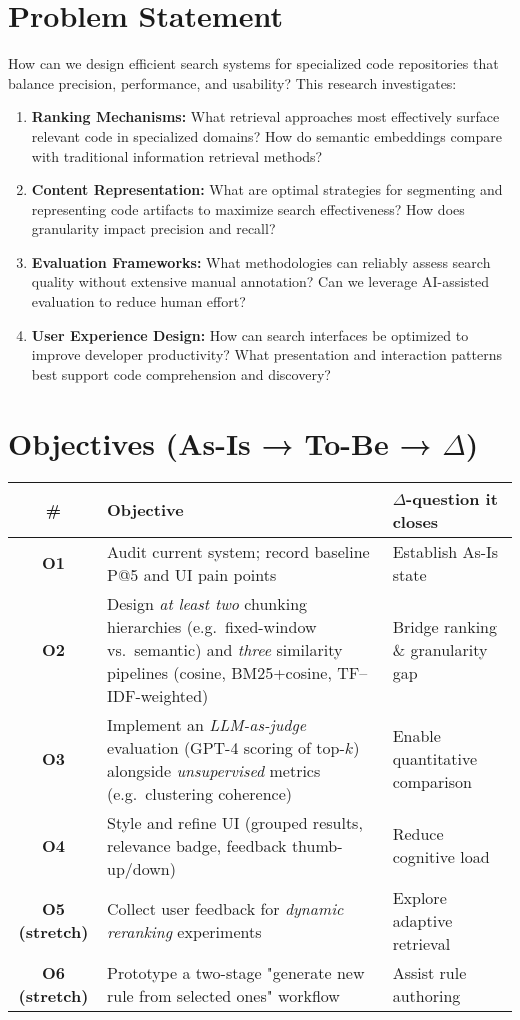 \documentclass[12pt,a4paper]{article}
\begin{document}
\section*{Problem Statement}
How can we design efficient search systems for specialized code repositories that balance precision, performance, and usability? This research investigates:
\begin{enumerate}
  \item \textbf{Ranking Mechanisms:} What retrieval approaches most effectively surface relevant code in specialized domains? How do semantic embeddings compare with traditional information retrieval methods?
  
  \item \textbf{Content Representation:} What are optimal strategies for segmenting and representing code artifacts to maximize search effectiveness? How does granularity impact precision and recall?
  
  \item \textbf{Evaluation Frameworks:} What methodologies can reliably assess search quality without extensive manual annotation? Can we leverage AI-assisted evaluation to reduce human effort?
  
  \item \textbf{User Experience Design:} How can search interfaces be optimized to improve developer productivity? What presentation and interaction patterns best support code comprehension and discovery?
\end{enumerate}

\section*{Objectives (As-Is → To-Be → \(\Delta\))}
\begin{table}[H]
\centering
\begin{tabularx}{\textwidth}{|c|X|X|}
\hline
\textbf{\#} & \textbf{Objective} & \textbf{\(\Delta\)-question it closes} \\
\hline
\textbf{O1} & Audit current system; record baseline P@5 and UI pain points & Establish As-Is state \\
\hline
\textbf{O2} & Design \emph{at least two} chunking hierarchies (e.g.\ fixed-window vs.\ semantic) and \emph{three} similarity pipelines (cosine, BM25+cosine, TF–IDF-weighted) & Bridge ranking \& granularity gap \\
\hline
\textbf{O3} & Implement an \emph{LLM-as-judge} evaluation (GPT-4 scoring of top-\(k\)) alongside \emph{unsupervised} metrics (e.g.\ clustering coherence) & Enable quantitative comparison \\
\hline
\textbf{O4} & Style and refine UI (grouped results, relevance badge, feedback thumb-up/down) & Reduce cognitive load \\
\hline
\textbf{O5 (stretch)} & Collect user feedback for \emph{dynamic reranking} experiments & Explore adaptive retrieval \\
\hline
\textbf{O6 (stretch)} & Prototype a two-stage "generate new rule from selected ones" workflow & Assist rule authoring \\
\hline
\end{tabularx}
\end{table}
\end{document}
